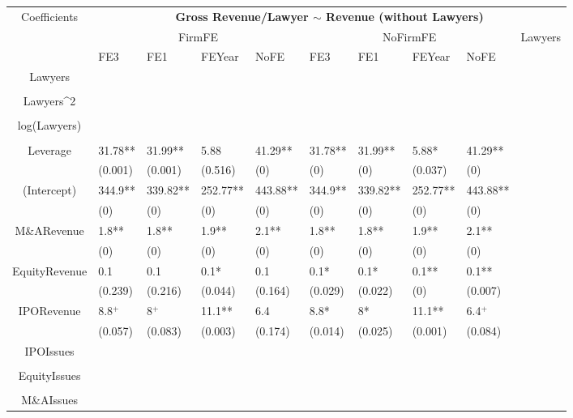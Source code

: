 \documentclass{article}
\begin{document}
\begin{table}[H]
\centering
\begin{tabular}{|clllllllll|}
\hline
\multirow{3}{*}{Coefficients} & \multicolumn{9}{c|}{\textbf{Gross Revenue/Lawyer $\sim$ Revenue (without Lawyers)}} \\
\cline{2-10}
& \multicolumn{4}{c}{FirmFE} & \multicolumn{4}{c}{NoFirmFE} & \multirow{2}{*}{Lawyers} \\
\cline{2-9}
& FE3 & FE1 & FEYear & NoFE & FE3 & FE1 & FEYear & NoFE &  \\
\hline
 
Lawyers &  &  &  &  &  &  &  &  & \\ 
   &  &  &  &  &  &  &  &  & \\ 
  Lawyers^2 &  &  &  &  &  &  &  &  & \\ 
   &  &  &  &  &  &  &  &  & \\ 
  log(Lawyers) &  &  &  &  &  &  &  &  & \\ 
   &  &  &  &  &  &  &  &  & \\ 
  Leverage & 31.78** & 31.99** & 5.88 & 41.29** & 31.78** & 31.99** & 5.88* & 41.29** & \\ 
   & (0.001) & (0.001) & (0.516) & (0) & (0) & (0) & (0.037) & (0) & \\ 
  (Intercept) & 344.9** & 339.82** & 252.77** & 443.88** & 344.9** & 339.82** & 252.77** & 443.88** & \\ 
   & (0) & (0) & (0) & (0) & (0) & (0) & (0) & (0) & \\ 
  M\&ARevenue & 1.8** & 1.8** & 1.9** & 2.1** & 1.8** & 1.8** & 1.9** & 2.1** & \\ 
   & (0) & (0) & (0) & (0) & (0) & (0) & (0) & (0) & \\ 
  EquityRevenue & 0.1 & 0.1 & 0.1* & 0.1 & 0.1* & 0.1* & 0.1** & 0.1** & \\ 
   & (0.239) & (0.216) & (0.044) & (0.164) & (0.029) & (0.022) & (0) & (0.007) & \\ 
  IPORevenue & 8.8$^{+}$ & 8$^{+}$ & 11.1** & 6.4 & 8.8* & 8* & 11.1** & 6.4$^{+}$ & \\ 
   & (0.057) & (0.083) & (0.003) & (0.174) & (0.014) & (0.025) & (0.001) & (0.084) & \\ 
  IPOIssues &  &  &  &  &  &  &  &  & \\ 
   &  &  &  &  &  &  &  &  & \\ 
  EquityIssues &  &  &  &  &  &  &  &  & \\ 
   &  &  &  &  &  &  &  &  & \\ 
  M\&AIssues &  &  &  &  &  &  &  &  & \\ 

\end{tabular}
\end{table}
\end{document}
